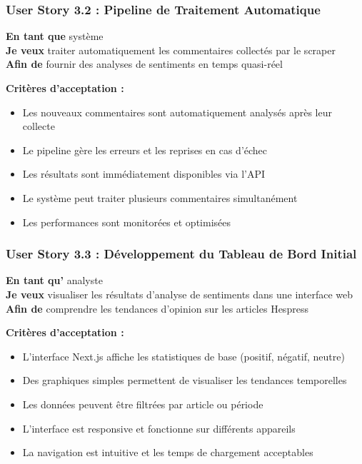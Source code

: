 \subsubsection{User Story 3.2 : Pipeline de Traitement Automatique}

\textbf{En tant que} système \\
\textbf{Je veux} traiter automatiquement les commentaires collectés par le scraper \\
\textbf{Afin de} fournir des analyses de sentiments en temps quasi-réel

\textbf{Critères d'acceptation :}
\begin{itemize}
    \item Les nouveaux commentaires sont automatiquement analysés après leur collecte
    \item Le pipeline gère les erreurs et les reprises en cas d'échec
    \item Les résultats sont immédiatement disponibles via l'API
    \item Le système peut traiter plusieurs commentaires simultanément
    \item Les performances sont monitorées et optimisées
\end{itemize}

\subsubsection{User Story 3.3 : Développement du Tableau de Bord Initial}

\textbf{En tant qu'} analyste \\
\textbf{Je veux} visualiser les résultats d'analyse de sentiments dans une interface web \\
\textbf{Afin de} comprendre les tendances d'opinion sur les articles Hespress

\textbf{Critères d'acceptation :}
\begin{itemize}
    \item L'interface Next.js affiche les statistiques de base (positif, négatif, neutre)
    \item Des graphiques simples permettent de visualiser les tendances temporelles
    \item Les données peuvent être filtrées par article ou période
    \item L'interface est responsive et fonctionne sur différents appareils
    \item La navigation est intuitive et les temps de chargement acceptables
\end{itemize}

